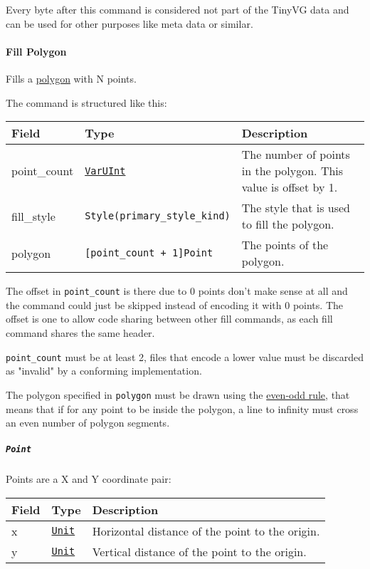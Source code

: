 \documentclass[]{article}
\begin{document}
Every byte after this command is considered not part of the TinyVG data
and can be used for other purposes like meta data or similar.

\hypertarget{fill-polygon}{%
\paragraph{Fill Polygon}\label{fill-polygon}}

Fills a \href{https://en.wikipedia.org/wiki/Polygon}{polygon} with N
points.

The command is structured like this:

\begin{longtable}[]{@{}lll@{}}
\toprule
Field & Type & Description \\
\midrule
\endhead
point\_count & \protect\hyperlink{varuint}{\texttt{VarUInt}} & The
number of points in the polygon. This value is offset by 1. \\
fill\_style & \texttt{Style(primary\_style\_kind)} & The style that is
used to fill the polygon. \\
polygon & \texttt{{[}point\_count\ +\ 1{]}Point} & The points of the
polygon. \\
\bottomrule
\end{longtable}

The offset in \texttt{point\_count} is there due to 0 points don't make
sense at all and the command could just be skipped instead of encoding
it with 0 points. The offset is one to allow code sharing between other
fill commands, as each fill command shares the same header.

\texttt{point\_count} must be at least 2, files that encode a lower
value must be discarded as "invalid" by a conforming implementation.

The polygon specified in \texttt{polygon} must be drawn using the
\href{https://en.wikipedia.org/wiki/Even\%E2\%80\%93odd_rule}{even-odd
rule}, that means that if for any point to be inside the polygon, a line
to infinity must cross an even number of polygon segments.

\hypertarget{point}{%
\subparagraph{\texorpdfstring{\texttt{Point}}{Point}}\label{point}}

Points are a X and Y coordinate pair:

\begin{longtable}[]{@{}lll@{}}
\toprule
Field & Type & Description \\
\midrule
\endhead
x & \protect\hyperlink{units}{\texttt{Unit}} & Horizontal distance of
the point to the origin. \\
y & \protect\hyperlink{units}{\texttt{Unit}} & Vertical distance of the
point to the origin. \\
\bottomrule
\end{longtable}
\end{document}
